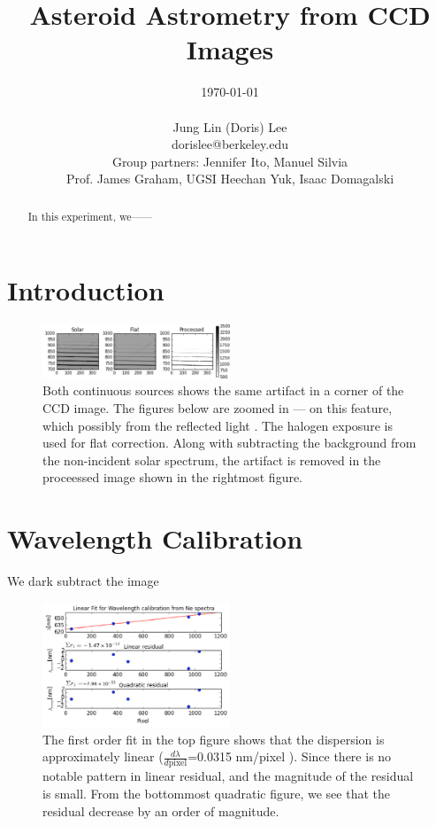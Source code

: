 \documentclass[authoryear, 12pt,5p, times]{elsarticle}
\begin{document}
\begin{frontmatter}
\title{Asteroid Astrometry from CCD Images}
\author{\today \\ \quad \\Jung Lin (Doris) Lee\\ dorislee@berkeley.edu\\Group partners: Jennifer Ito, Manuel Silvia\\Prof. James Graham, UGSI Heechan Yuk, Isaac Domagalski}
	\begin{abstract}
In this experiment,  we------
	\end{abstract}
\end{frontmatter}
\section{Introduction}
 \begin{figure}[h!]
\includegraphics[width=0.5\textwidth]{figures/processed}
\caption{Both continuous sources shows the same artifact in a corner of the CCD image. The figures below are zoomed in --- on this feature, which  possibly from the reflected light . The halogen exposure is used for flat correction. Along with subtracting the background from the non-incident solar spectrum, the artifact is removed in the proceessed image shown in the rightmost figure.}
\label{processed}
\end{figure}
\section{Wavelength Calibration}
 We dark subtract the image 
 \begin{figure}[h!]
\includegraphics[width=0.5\textwidth]{figures/wavelength_calib}
\caption{The first order fit in the top figure shows that the dispersion is approximately linear ($\frac{d\lambda}{d\text{pixel}}$=0.0315 nm/pixel ). Since there is no notable pattern in linear residual, and the magnitude of the residual is small. From the bottommost quadratic figure, we see that the residual decrease by an order of magnitude.}
\label{calib}
\end{figure}
\end{document}
